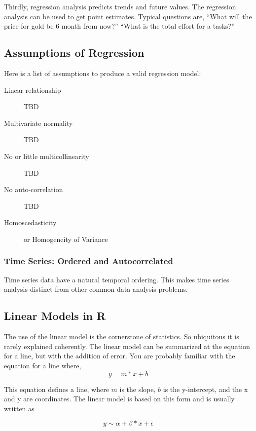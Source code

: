\documentclass{article}\usepackage[]{graphicx}\usepackage[]{color}
\begin{document}
Thirdly, regression analysis predicts trends and future values.  The regression analysis can be used to get point estimates.  Typical questions are, ``What will the price for gold be 6 month from now?'' ``What is the total effort for a tasks?''

\subsection{Assumptions of Regression}

Here is a list of assumptions to produce a valid regression model:

\begin{description}
  \item[Linear relationship] TBD
  \item[Multivariate normality] TBD
  \item[No or little multicollinearity] TBD
  \item[No auto-correlation] TBD
  \item[Homoscedasticity] or Homogeneity of Variance
\end{description}

\subsubsection{Time Series: Ordered and Autocorrelated}

Time series data have a natural temporal ordering. This makes time series analysis distinct from other common data analysis problems.

\subsection{Linear Models in R}

The use of the linear model is the cornerstone of statistics. So ubiquitous it is rarely explained coherently. The linear model can be summarized at the equation for a line, but with the addition of error. You are probably familiar with the equation for a line where, 
\begin{equation}
y = m * x + b
\end{equation}

This equation defines a line, where $m$ is the slope, $b$ is the y-intercept, and the x and y are coordinates. The linear model is based on this form and is usually written as  

\begin{equation}
y \sim \alpha + \beta * x + \epsilon
\end{equation}
\end{document}

